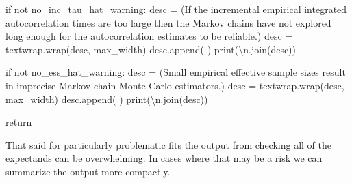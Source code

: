 \documentclass[
  letterpaper,
  DIV=11,
  numbers=noendperiod]{scrartcl}
\newenvironment{Shaded}{\begin{snugshade}}{\end{snugshade}}
\newcommand{\BuiltInTok}[1]{\textcolor[rgb]{0.00,0.23,0.31}{#1}}
\newcommand{\CharTok}[1]{\textcolor[rgb]{0.13,0.47,0.30}{#1}}
\newcommand{\ControlFlowTok}[1]{\textcolor[rgb]{0.00,0.23,0.31}{#1}}
\newcommand{\KeywordTok}[1]{\textcolor[rgb]{0.00,0.23,0.31}{#1}}
\newcommand{\NormalTok}[1]{\textcolor[rgb]{0.00,0.23,0.31}{#1}}
\newcommand{\OperatorTok}[1]{\textcolor[rgb]{0.37,0.37,0.37}{#1}}
\newcommand{\StringTok}[1]{\textcolor[rgb]{0.13,0.47,0.30}{#1}}
\begin{document}
\begin{Shaded}
\begin{Highlighting}[]
  \ControlFlowTok{if} \KeywordTok{not}\NormalTok{ no\_inc\_tau\_hat\_warning:}
\NormalTok{    desc }\OperatorTok{=}\NormalTok{ (}\StringTok{\textquotesingle{}If the incremental empirical integrated autocorrelation \textquotesingle{}}
            \StringTok{\textquotesingle{}times are too large then the Markov \textquotesingle{}}
            \StringTok{\textquotesingle{}chains have not explored long enough for the \textquotesingle{}}
            \StringTok{\textquotesingle{}autocorrelation estimates to be reliable.\textquotesingle{}}\NormalTok{)}
\NormalTok{    desc }\OperatorTok{=}\NormalTok{ textwrap.wrap(desc, max\_width)}
\NormalTok{    desc.append(}\StringTok{\textquotesingle{} \textquotesingle{}}\NormalTok{)}
    \BuiltInTok{print}\NormalTok{(}\StringTok{\textquotesingle{}}\CharTok{\textbackslash{}n}\StringTok{\textquotesingle{}}\NormalTok{.join(desc))}
  
  \ControlFlowTok{if} \KeywordTok{not}\NormalTok{ no\_ess\_hat\_warning:}
\NormalTok{    desc }\OperatorTok{=}\NormalTok{ (}\StringTok{\textquotesingle{}Small empirical effective sample sizes result in \textquotesingle{}}
            \StringTok{\textquotesingle{}imprecise Markov chain Monte Carlo estimators.\textquotesingle{}}\NormalTok{)}
\NormalTok{    desc }\OperatorTok{=}\NormalTok{ textwrap.wrap(desc, max\_width)}
\NormalTok{    desc.append(}\StringTok{\textquotesingle{} \textquotesingle{}}\NormalTok{)}
    \BuiltInTok{print}\NormalTok{(}\StringTok{\textquotesingle{}}\CharTok{\textbackslash{}n}\StringTok{\textquotesingle{}}\NormalTok{.join(desc))}
    
  \ControlFlowTok{return}
\end{Highlighting}
\end{Shaded}

That said for particularly problematic fits the output from checking all
of the expectands can be overwhelming. In cases where that may be a risk
we can summarize the output more compactly.
\end{document}
